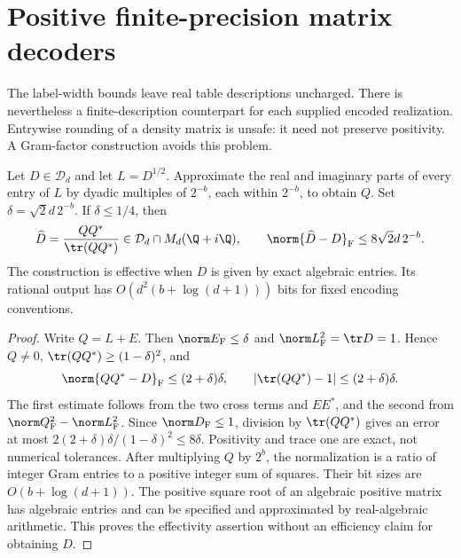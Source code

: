 \section{Positive finite-precision matrix decoders}\label{sec:matrixprecision57}
The label-width bounds leave real table descriptions uncharged. There is
nevertheless a finite-description counterpart for each supplied encoded
realization. Entrywise rounding of a density matrix is unsafe: it need not
preserve positivity. A Gram-factor construction avoids this problem.

\begin{lemma}\label{lem:positiveprecision57}
Let $D\in\mathcal D_d$ and let $L=D^{1/2}$. Approximate the real and imaginary
parts of every entry of $L$ by dyadic multiples of $2^{-b}$, each within
$2^{-b}$, to obtain $Q$. Set $\delta=\sqrt2d\,2^{-b}$. If $\delta\le1/4$, then
\begin{equation}\label{eq:gramround57}
 \widehat D=\frac{QQ^*}{\tr(QQ^*)}\in\mathcal D_d\cap
            M_d(\Q+i\Q),\qquad
 \norm{\widehat D-D}_{\mathrm F}\le8\sqrt2d\,2^{-b}.
\end{equation}
The construction is effective when $D$ is given by exact algebraic entries.
Its rational output has $O(d^2(b+\log(d+1)))$ bits for fixed encoding
conventions.
\end{lemma}
\begin{proof}
Write $Q=L+E$. Then $\norm E_{\mathrm F}\le\delta$ and
$\norm L_{\mathrm F}^2=\tr D=1$. Hence $Q\ne0$,
$\tr(QQ^*)\ge(1-\delta)^2$, and
\[
 \norm{QQ^*-D}_{\mathrm F}\le(2+\delta)\delta,
 \qquad |\tr(QQ^*)-1|\le(2+\delta)\delta.
\]
The first estimate follows from the two cross terms and $EE^*$, and the
second from $\norm Q_{\mathrm F}^2-\norm L_{\mathrm F}^2$. Since
$\norm D_{\mathrm F}\le1$, division by $\tr(QQ^*)$ gives an error at most
$2(2+\delta)\delta/(1-\delta)^2\le8\delta$. Positivity and trace one are
exact, not numerical tolerances. After multiplying $Q$ by $2^b$, the
normalization is a ratio of integer Gram entries to a positive integer
sum of squares. Their bit sizes are $O(b+\log(d+1))$. The positive square
root of an algebraic positive matrix has algebraic entries and can be
specified and approximated by real-algebraic arithmetic. This proves the
effectivity assertion without an efficiency claim for obtaining $D$.
\end{proof}

